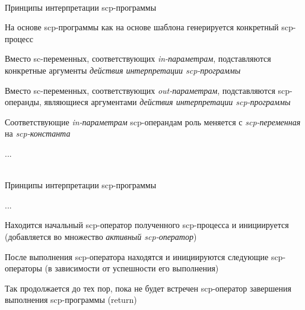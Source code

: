 \begin{frame}{\\Принципы интерпретации scp-программы}
	\topline
	\justifying
	
	\vspace{10mm}
	
	\begin{textitemize}
		\item На основе scp-программы как на основе шаблона генерируется конкретный scp-процесс
		\begin{textitemize}
			\item Вместо sc-переменных, соответствующих \textit{in-параметрам\scnrolesign}, подставляются конкретные аргументы \textit{действия интерпретации scp-программы}
			\item Вместо sc-переменных, соответствующих \textit{out-параметрам\scnrolesign}, подставляются scp-операнды, являющиеся аргументами \textit{действия интерпретации scp-программы}
			\item Соответствующие \textit{in-параметрам\scnrolesign} scp-операндам роль меняется с \textit{scp-переменная\scnrolesign} на \textit{scp-константа\scnrolesign}
		\end{textitemize}
		\item ...
	\end{textitemize}
		
\end{frame}

\begin{frame}{\\Принципы интерпретации scp-программы}
	\topline
	\justifying
	
	\vspace{10mm}
	
	\begin{textitemize}
		\item ...
		\item Находится начальный scp-оператор полученного scp-процесса и инициируется (добавляется во множество \textit{активный scp-оператор})
		\item После выполнения scp-оператора находятся и инициируются следующие scp-операторы (в зависимости от успешности его выполнения) 
		\item Так продолжается до тех пор, пока не будет встречен scp-оператор завершения выполнения scp-программы (return)
	\end{textitemize}
	
\end{frame}

